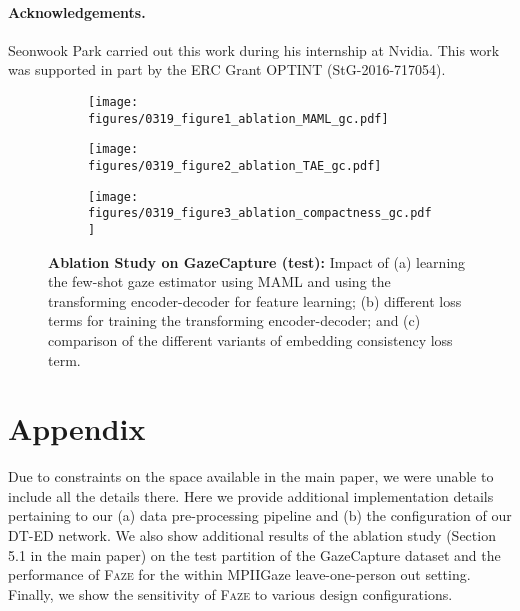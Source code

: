 \documentclass[10pt,twocolumn,letterpaper]{article}
\newcommand{\faze}[0]{\textsc{Faze}\xspace}
\begin{document}
\paragraph{Acknowledgements.}
Seonwook Park carried out this work during his internship at Nvidia.
This work was supported in part by the ERC Grant OPTINT (StG-2016-717054). 
\clearpage
\balance
{\small


}

\clearpage
\balance
\begin{figure*}[]
    \vspace*{3mm}
    \centering
    \begin{subfigure}[b]{0.33\textwidth}
        \texttt{[image: figures/0319\_figure1\_ablation\_MAML\_gc.pdf]}
        \vskip -1mm
        \caption{\vspace{-3mm}}
        \label{fig:maml-vs-nomaml}
    \end{subfigure}
    \hfill
    \begin{subfigure}[b]{0.33\textwidth}
        \texttt{[image: figures/0319\_figure2\_ablation\_TAE\_gc.pdf]}
        \vskip -1mm
        \caption{\vspace{-3mm}}
        \label{fig:impact_of_loss_terms}
    \end{subfigure}
    \begin{subfigure}[b]{0.33\textwidth}
        \texttt{[image: figures/0319\_figure3\_ablation\_compactness\_gc.pdf]}
        \vskip -1mm
        \caption{\vspace{-3mm}}
        \label{fig:impact_of_embedding consistency}
    \end{subfigure}
    \caption{\textbf{Ablation Study on GazeCapture (test):} Impact of (a) learning the few-shot gaze estimator using MAML and using the transforming encoder-decoder for feature learning; (b) different loss terms for training the transforming encoder-decoder; and (c) comparison of the different variants of embedding consistency loss term. 
    }
    \label{fig:ablation}
\end{figure*}

\setcounter{section}{0}
\renewcommand{\thesection}{\Alph{section}}
\section*{\Large Appendix}
\noindent
Due to constraints on the space available in the main paper, we were unable to include all the details there. Here we provide additional implementation details pertaining to our (a) data pre-processing pipeline and (b) the configuration of our DT-ED network. We also show additional results of the ablation study (Section 5.1 in the main paper) on the test partition of the GazeCapture dataset and the performance of \faze for the within MPIIGaze leave-one-person out setting. Finally, we show the sensitivity of \faze to various design configurations.
\end{document}
